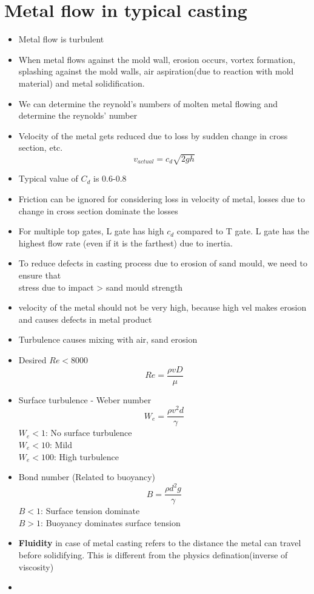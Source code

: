 \documentclass{article}
\begin{document}
\section{Metal flow in typical casting}
\begin{itemize}
	\item Metal flow is turbulent
	\item When metal flows against the mold wall, erosion occurs, vortex formation, splashing against the mold walls, air aspiration(due to reaction with mold material) and metal solidification.
	\item We can determine the reynold's numbers of molten metal flowing and determine the reynolds' number
	\item Velocity of the metal gets reduced due to loss by sudden change in cross section, etc.
		\[v_{actual}=c_d \sqrt{2gh}\]
	\item Typical value of $C_d$ is 0.6-0.8
	\item Friction can be ignored for considering loss in velocity of metal, losses due to change in cross section dominate the losses
	\item For multiple top gates, L gate has high $c_d$ compared to T gate. L gate has the highest flow rate (even if it is the farthest) due to inertia.
	\item To reduce defects in casting process due to erosion of sand mould, we need to ensure that \\
	stress due to impact > sand mould strength
	\item velocity of the metal should not be very high, because high vel makes erosion and causes defects in metal product
	\item Turbulence causes mixing with air, sand erosion	

	\item Desired $Re <8000$
	\[Re = \frac{\rho v D}{\mu}\]

	\item Surface turbulence - Weber number
	\[W_e = \frac{\rho v^2 d}{\gamma}\]
	$W_e <1$: No surface turbulence\\
	$W_e <10$: Mild \\
	$W_e <100$: High turbulence

	\item Bond number (Related to buoyancy)
	\[B = \frac{\rho d^2 g}{\gamma}\]
	$B <1$: Surface tension dominate\\
	$B>1$: Buoyancy dominates surface tension

	\item \textbf{Fluidity} in case of metal casting refers to the distance the metal can travel before solidifying. This is different from the physics defination(inverse of viscosity)
	\item 

\end{itemize}
\end{document}
